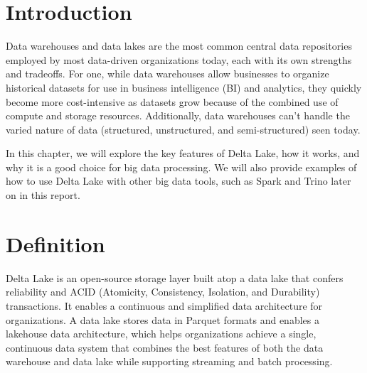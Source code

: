 \section*{Introduction}


Data warehouses and data lakes are the most common central data repositories employed by most data-driven organizations today, each with its own strengths and tradeoffs. For one, while data warehouses allow businesses to organize historical datasets for use in business intelligence (BI) and analytics, they quickly become more cost-intensive as datasets grow because of the combined use of compute and storage resources. Additionally, data warehouses can’t handle the varied nature of data (structured, unstructured, and semi-structured) seen today.

In this chapter, we will explore the key features of Delta Lake, how it works, and why it is a good choice for big data processing. We will also provide examples of how to use Delta Lake with other big data tools, such as Spark and Trino later on in this report.
\section{Definition}
Delta Lake is an open-source storage layer built atop a data lake that confers reliability and ACID (Atomicity, Consistency, Isolation, and Durability) transactions. It enables a continuous and simplified data architecture for organizations. A data lake stores data in Parquet formats and enables a lakehouse data architecture, which helps organizations achieve a single, continuous data system that combines the best features of both the data warehouse and data lake while supporting streaming and batch processing.

